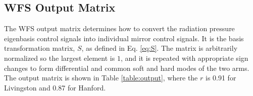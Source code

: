 



\subsection{WFS Output Matrix}
The WFS output matrix determines how to convert the radiation pressure
eigenbasis control signals into individual mirror control signals. It
is the basis transformation matrix, $S$, as defined in
Eq. \ref{eq:S}. The matrix is arbitrarily normalized so the largest
element is $1$, and it is repeated with appropriate sign changes to
form differential and common soft and hard modes of the two arms. The
output matrix is shown in Table \ref{table:output}, where the $r$ is
0.91 for Livingston and 0.87 for Hanford. 

